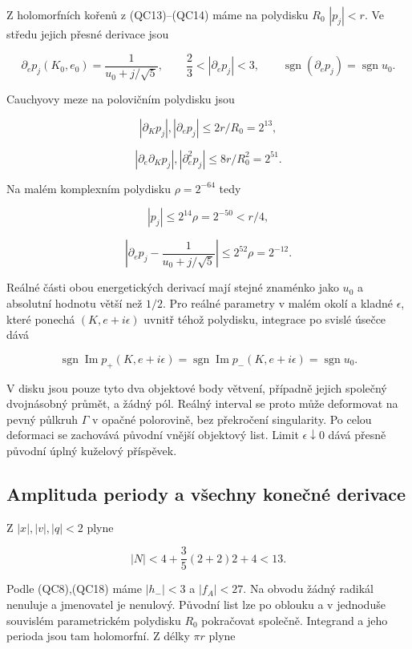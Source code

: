 \documentclass[11pt,a4paper]{article}
\theoremstyle{remark}\newtheorem{remark}[theorem]{Poznámka}
\numberwithin{equation}{section}
\begin{document}
Z holomorfních kořenů z (QC13)--(QC14) máme na polydisku \(R_0\) \(|p_j|<r\).
Ve středu jejich přesné derivace jsou

\[
\partial_ep_j(K_0,e_0)=\frac1{u_0+j/\sqrt5},\qquad
\frac23<|\partial_ep_j|<3,
\qquad \operatorname{sgn}(\partial_ep_j)=\operatorname{sgn}u_0.
\tag{QC19}
\]

Cauchyovy meze na polovičním polydisku jsou

\[
|\partial_Kp_j|,|\partial_ep_j|\le2r/R_0=2^{13},
\]

\[
|\partial_e\partial_Kp_j|,|\partial_e^2p_j|
\le8r/R_0^2=2^{51}.
\tag{QC20}
\]

Na malém komplexním polydisku \(\rho=2^{-64}\) tedy

\[
|p_j|\le2^{14}\rho=2^{-50}<r/4,
\]

\[
\left|\partial_ep_j-\frac1{u_0+j/\sqrt5}\right|
\le2^{52}\rho=2^{-12}.
\tag{QC21}
\]

Reálné části obou energetických derivací mají stejné znaménko jako
\(u_0\) a absolutní hodnotu větší než \(1/2\). Pro reálné parametry v
malém okolí a kladné \(\epsilon\), které ponechá \((K,e+i\epsilon)\)
uvnitř téhož polydisku, integrace po svislé úsečce dává

\[
\boxed{
\operatorname{sgn}\operatorname{Im}p_+(K,e+i\epsilon)
=\operatorname{sgn}\operatorname{Im}p_-(K,e+i\epsilon)
=\operatorname{sgn}u_0.
}
\tag{QC22}
\]

V disku jsou pouze tyto dva objektové body větvení, případně jejich
společný dvojnásobný průmět, a žádný pól. Reálný interval se proto může
deformovat na pevný půlkruh \(\Gamma\) v opačné polorovině, bez
překročení singularity. Po celou deformaci se zachovává původní vnější
objektový list. Limit \(\epsilon\downarrow0\) dává přesně původní úplný
kuželový příspěvek.

\hypertarget{amplituda-periody-a-vux161echny-koneux10dnuxe9-derivace}{%
\subsection{Amplituda periody a všechny konečné
derivace}\label{amplituda-periody-a-vux161echny-koneux10dnuxe9-derivace}}

Z \(|x|,|v|,|q|<2\) plyne

\[
|N|<4+\frac35(2+2)2+4<13.
\]

Podle (QC8),(QC18) máme \(|h_-|<3\) a \(|f_A|<27\). Na obvodu žádný
radikál nenuluje a jmenovatel je nenulový. Původní list lze po oblouku a
v jednoduše souvislém parametrickém polydisku \(R_0\) pokračovat
společně. Integrand a jeho perioda jsou tam holomorfní. Z délky
\(\pi r\) plyne
\end{document}
